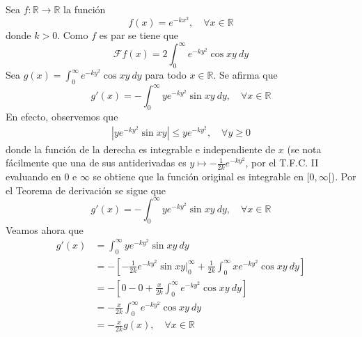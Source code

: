 \documentclass[12pt]{report}
\theoremstyle{largebreak}
\renewcommand{\leq}{\ensuremath{\leqslant}}
\renewcommand{\geq}{\ensuremath{\geqslant}}
\newcommand\abs[1]{\ensuremath{\left|#1\right|}}
\newcommand\cf[3]{\ensuremath{#1:#2\rightarrow#3}}
\newcommand{\fou}[1]{\ensuremath{\mathcal{F}#1}}
\begin{document}
    \begin{exa}
        Sea $\cf{f}{\mathbb{R}}{\mathbb{R}}$ la función
        \begin{equation*}
            f(x)=e^{ -kx^2},\quad\forall x\in\mathbb{R}
        \end{equation*}
        donde $k>0$. Como $f$ es par se tiene que
        \begin{equation*}
            \fou{f}(x)=2\int_0^{\infty}e^{ -ky^2}\cos xy\:dy
        \end{equation*}
        Sea $g(x)=\int_0^\infty e^{ -ky^2}\cos xy\:dy$ para todo $x\in\mathbb{R}$. Se afirma que
        \begin{equation*}
            g'(x)=-\int_0^{\infty}ye^{ -ky^2}\sin xy\:dy,\quad\forall x\in\mathbb{R}
        \end{equation*}
        En efecto, observemos que
        \begin{equation*}
            \begin{split}
                \abs{ye^{-ky^2}\sin xy}\leq ye^{-ky^2},\quad\forall y\geq0
            \end{split}
        \end{equation*}
        donde la función de la derecha es integrable e independiente de $x$ (se nota fácilmente que una de sus antiderivadas es $y\mapsto-\frac{1}{2k}e^{ -ky^2}$, por el T.F.C. II evaluando en $0$ e $\infty$ se obtiene que la función original es integrable en $[0,\infty[$). Por el Teorema de derivación se sigue que
        \begin{equation*}
            g'(x)=-\int_0^{\infty}ye^{ -ky^2}\sin xy\:dy,\quad\forall x\in\mathbb{R}
        \end{equation*}
        Veamos ahora que
        \begin{equation*}
            \begin{split}
                g'(x)&=\int_0^{\infty}ye^{ -ky^2}\sin xy\:dy\\
                &=-\left[-\frac{1}{2k}e^{ -ky^2}\sin xy\Big|_0^{\infty}+\frac{1}{2k}\int_0^{\infty}xe^{ -ky^2}\cos xy\:dy \right]\\
                &=-\left[0-0+\frac{x}{2k}\int_0^{\infty}e^{ -ky^2}\cos xy\:dy \right]\\
                &=-\frac{x}{2k}\int_0^{\infty}e^{ -ky^2}\cos xy\:dy\\
                &=-\frac{x}{2k}g(x),\quad\forall x\in\mathbb{R} \\
            \end{split}
        \end{equation*}

\end{exa}
\end{document}

